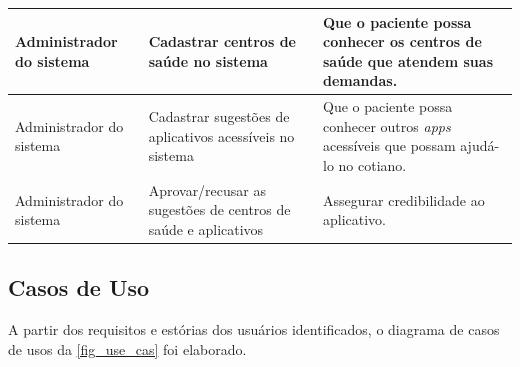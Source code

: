 \begin{table}[htb]
\begin{center}
\begin{tabular}{p{2.0cm}|p{5.0cm}|p{7.0cm}}
            \hline
            Administrador do sistema                                       &
            Cadastrar centros de saúde no sistema                          &
            Que o paciente possa conhecer os centros de saúde que atendem suas demandas.                                        \\
            \hline
            Administrador do sistema                                       &
            Cadastrar sugestões de aplicativos acessíveis no sistema       &
            Que o paciente possa conhecer outros \emph{apps} acessíveis que possam ajudá\@-lo no cotiano.                       \\
            \hline
            Administrador do sistema                                       &
            Aprovar/recusar as sugestões de centros de saúde e aplicativos &
            Assegurar credibilidade ao aplicativo.                                                                              \\
        \end{tabular}
    \end{center}
\end{table}

\newpage

\subsection{Casos de Uso}

A partir dos requisitos e estórias dos usuários identificados, o diagrama de casos de usos da \autoref{fig_use_cas} foi elaborado.

